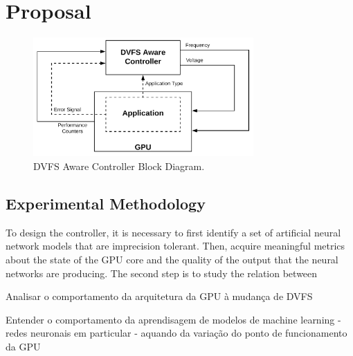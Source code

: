 
\chapter{Proposal}
\label{chapter:implementation}


\begin{figure}[!htb]
  \centering
  \includegraphics[width=0.75\textwidth]{Figures/Proposel/DVFS_Aware_Controller.png}
  \caption[Controller]{DVFS Aware Controller Block Diagram.}
  \label{fig:controlerDVFSaware}
\end{figure}


\section{Experimental Methodology}

To design the controller, it is necessary to first identify a set of artificial neural network models that are imprecision tolerant. Then, acquire meaningful metrics about the state of the GPU core and the quality of the output that the neural networks are producing. The second step is to study the relation between 

Analisar o comportamento da arquitetura da GPU à mudança de DVFS

Entender o comportamento da aprendisagem de modelos de machine learning - redes neuronais em particular - aquando da variação do ponto de funcionamento da GPU

